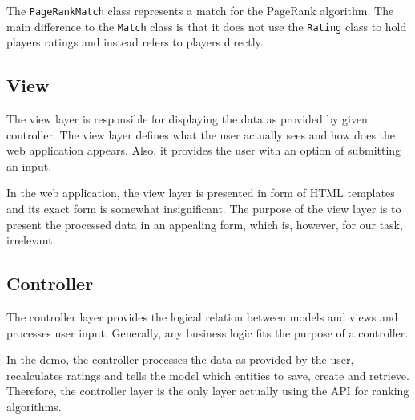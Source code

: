 The \texttt{PageRankMatch} class represents a match for the PageRank algorithm. The main difference to the \texttt{Match} class is that it does not use the \texttt{Rating} class to hold players ratings and instead refers to players directly.

\subsection{View}
The view layer is responsible for displaying the data as provided by given controller. The view layer defines what the user actually sees and how does the web application appears. Also, it provides the user with an option of submitting an input.

In the web application, the view layer is presented in form of HTML templates and its exact form is somewhat insignificant. The purpose of the view layer is to present the processed data in an appealing form, which is, however, for our task, irrelevant.

\subsection{Controller}
The controller layer provides the logical relation between models and views and processes user input. Generally, any business logic fits the purpose of a controller.

In the demo, the controller processes the data as provided by the user, recalculates ratings and tells the model which entities to save, create and retrieve. Therefore, the controller layer is the only layer actually using the API for ranking algorithms.
